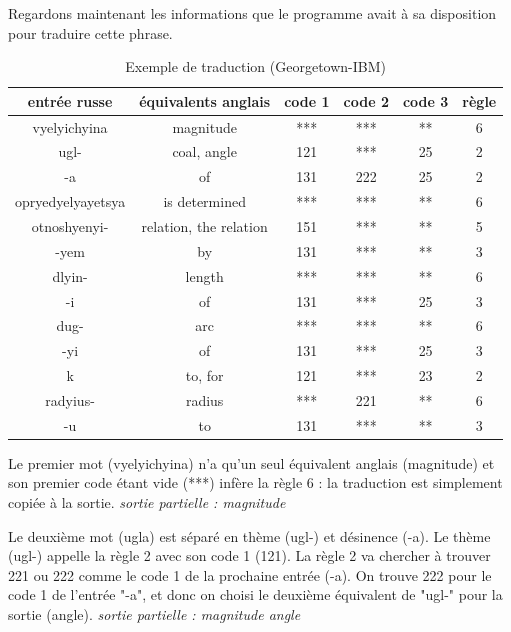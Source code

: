 \documentclass[11pt, a4paper]{report}
\begin{document}
Regardons maintenant les informations que le programme avait à sa disposition pour traduire 
cette phrase. 

\begin{table}[h] %
  \centering %
  \begin{tabular}{|c|c|c|c|c|c|} %
    \hline %
    entrée russe & équivalents anglais & code 1 & code 2 & code 3 & règle \\ %
    \hline
    vyelyichyina & magnitude & *** & *** & ** & 6 \\
    \hline
    ugl- & coal, angle & 121 & *** & 25 & 2 \\
    \hline 
    -a & of & 131 & 222 & 25 & 2 \\
    \hline 
    opryedyelyayetsya & is determined & *** & *** & ** & 6 \\
    \hline 
    otnoshyenyi- & relation, the relation & 151 & *** & ** & 5 \\ 
    \hline 
    -yem & by & 131 & *** & ** & 3 \\ 
    \hline 
    dlyin- & length & *** & *** & ** & 6 \\ 
    \hline 
    -i & of & 131 & *** & 25 & 3 \\ 
    \hline 
    dug- & arc & *** & *** & ** & 6 \\
    \hline 
    -yi & of & 131 & *** & 25 & 3 \\ 
    \hline 
    k & to, for & 121 & *** & 23 & 2 \\ 
    \hline 
    radyius- & radius & *** & 221 & ** & 6 \\ 
    \hline 
    -u & to & 131 & *** & ** & 3 \\
    \hline
  \end{tabular}
  \caption{Exemple de traduction (Georgetown-IBM)} %
  \label{tab:example} %
\end{table}

Le premier mot (vyelyichyina) n'a qu'un seul équivalent anglais (magnitude) et son 
premier code étant vide (***) infère la règle 6 : la traduction est simplement copiée 
à la sortie. \newline 
\textit{sortie partielle : magnitude} 

Le deuxième mot (ugla) est séparé en thème (ugl-) et désinence (-a). 
Le thème (ugl-) appelle la règle 2 avec son code 1 (121). La règle 2 va chercher à trouver 221 ou 222 
comme le code 1 de la prochaine entrée (-a). On trouve 222 pour le code 1 de l'entrée 
"-a", et donc on choisi le deuxième équivalent de "ugl-" pour la sortie (angle). \newline 
\textit{sortie partielle : magnitude angle}
\end{document}
